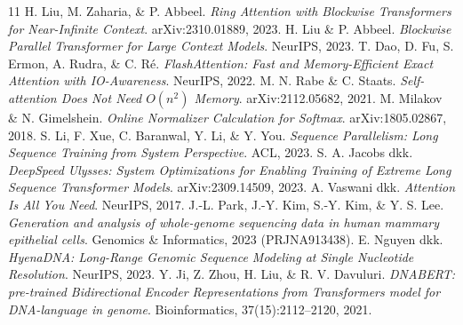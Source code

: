 \documentclass[11pt,a4paper]{article}
\begin{document}
\begin{thebibliography}{11}
 H. Liu, M. Zaharia, \& P. Abbeel. \emph{Ring Attention with Blockwise Transformers for Near-Infinite Context}. arXiv:2310.01889, 2023.
 H. Liu \& P. Abbeel. \emph{Blockwise Parallel Transformer for Large Context Models}. NeurIPS, 2023.
 T. Dao, D. Fu, S. Ermon, A. Rudra, \& C. R\'e. \emph{FlashAttention: Fast and Memory-Efficient Exact Attention with IO-Awareness}. NeurIPS, 2022.
 M. N. Rabe \& C. Staats. \emph{Self-attention Does Not Need $O(n^2)$ Memory}. arXiv:2112.05682, 2021.
 M. Milakov \& N. Gimelshein. \emph{Online Normalizer Calculation for Softmax}. arXiv:1805.02867, 2018.
 S. Li, F. Xue, C. Baranwal, Y. Li, \& Y. You. \emph{Sequence Parallelism: Long Sequence Training from System Perspective}. ACL, 2023.
 S. A. Jacobs dkk. \emph{DeepSpeed Ulysses: System Optimizations for Enabling Training of Extreme Long Sequence Transformer Models}. arXiv:2309.14509, 2023.
 A. Vaswani dkk. \emph{Attention Is All You Need}. NeurIPS, 2017.
 J.-L. Park, J.-Y. Kim, S.-Y. Kim, \& Y. S. Lee. \emph{Generation and analysis of whole-genome sequencing data in human mammary epithelial cells}. Genomics \& Informatics, 2023 (PRJNA913438).
 E. Nguyen dkk. \emph{HyenaDNA: Long-Range Genomic Sequence Modeling at Single Nucleotide Resolution}. NeurIPS, 2023.
 Y. Ji, Z. Zhou, H. Liu, \& R. V. Davuluri. \emph{DNABERT: pre-trained Bidirectional Encoder Representations from Transformers model for DNA-language in genome}. Bioinformatics, 37(15):2112--2120, 2021.
\end{thebibliography}
\end{document}
